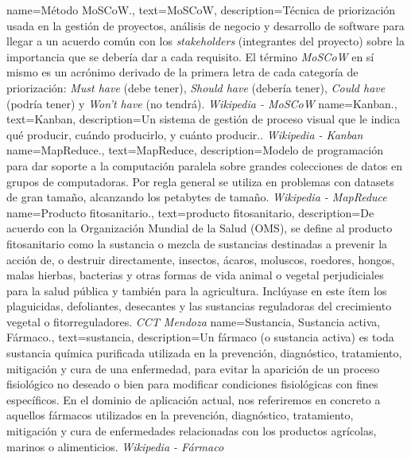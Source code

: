 {
    name={Método MoSCoW.},
    text={MoSCoW},
    description={Técnica de priorización usada en la gestión de proyectos, análisis de negocio y desarrollo de software para llegar a un acuerdo común con los \textit{stakeholders} (integrantes del proyecto) sobre la importancia que se debería dar a cada requisito. El término \textit{MoSCoW} en sí mismo es un acrónimo derivado de la primera letra de cada categoría de priorización: \textit{Must have} (debe tener), \textit{Should have} (debería tener), \textit{Could have} (podría tener) y \textit{Won't have} (no tendrá). \textit{Wikipedia - MoSCoW} \cite{wikimoscow}}
}
{
    name={Kanban.},
    text={Kanban},
    description={Un sistema de gestión de proceso visual que le indica qué producir, cuándo producirlo, y cuánto producir.. \textit{Wikipedia - Kanban} \cite{wikikanban}}
}
{
    name={MapReduce.},
    text={MapReduce},
    description={Modelo de programación para dar soporte a la computación paralela sobre grandes colecciones de datos en grupos de computadoras. Por regla general se utiliza en problemas con datasets de gran tamaño, alcanzando los petabytes de tamaño. \textit{Wikipedia - MapReduce} \cite{wikimapreduce}}
}
{
    name={Producto fitosanitario.},
    text={producto fitosanitario},
    description={De acuerdo con la Organización Mundial de la Salud (OMS), se define al producto fitosanitario como la \gls{sustancia} o mezcla de sustancias destinadas a prevenir la acción de, o destruir directamente, insectos, ácaros, moluscos, roedores, hongos, malas hierbas, bacterias y otras formas de vida animal o vegetal perjudiciales para la salud pública y también para la agricultura. Inclúyase en este ítem los plaguicidas, defoliantes, desecantes y las sustancias reguladoras del crecimiento vegetal o fitorreguladores. \textit{CCT Mendoza} \cite{cricyt}}
}
{
    name={Sustancia, Sustancia activa, Fármaco.},
    text={sustancia},
    description={Un fármaco (o sustancia activa) es toda sustancia química purificada utilizada en la prevención, diagnóstico, tratamiento, mitigación y cura de una enfermedad, para evitar la aparición de un proceso fisiológico no deseado o bien para modificar condiciones fisiológicas con fines específicos. En el dominio de aplicación actual, nos referiremos en concreto a aquellos fármacos utilizados en la prevención, diagnóstico, tratamiento, mitigación y cura de enfermedades relacionadas con los productos agrícolas, marinos o alimenticios. \textit{Wikipedia - Fármaco} \cite{farmacowiki}}
}


